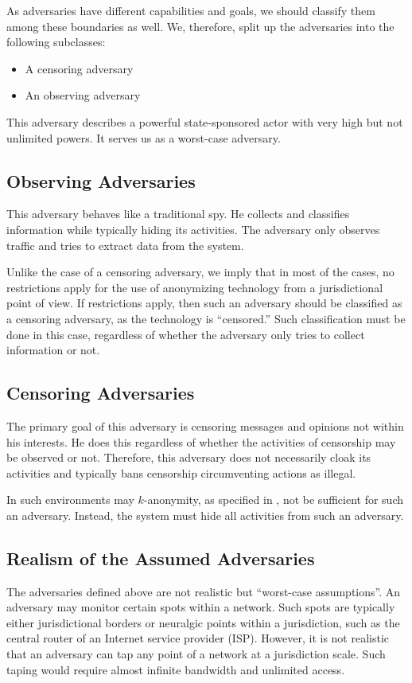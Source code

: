 As adversaries have different capabilities and goals, we should classify them among these boundaries as well. We, therefore, split up the adversaries into the following subclasses:
\begin{itemize}
	\item A censoring adversary
	\item An observing adversary
\end{itemize}

This adversary describes a powerful state-sponsored actor with very high but not unlimited powers. It serves us as a worst-case adversary.

\subsection{Observing Adversaries}
This adversary behaves like a traditional spy. He collects and classifies information while typically hiding its activities. The adversary only observes traffic and tries to extract data from the system.

Unlike the case of a censoring adversary, we imply that in most of the cases, no restrictions apply for the use of anonymizing technology from a jurisdictional point of view. If restrictions apply, then such an adversary should be classified as a censoring adversary, as the technology is ``censored.'' Such classification must be done in this case, regardless of whether the adversary only tries to collect information or not.

\subsection{Censoring Adversaries}
The primary goal of this adversary is censoring messages and opinions not within his interests. He does this regardless of whether the activities of censorship may be observed or not. Therefore, this adversary does not necessarily cloak its activities and typically bans censorship circumventing actions as illegal.

In such environments may $k$-anonymity, as specified in \cite{k-anonymous:ccs2003}, not be sufficient for such an adversary. Instead, the \MessageVortex{} system must hide all activities from such an adversary.

\subsection{Realism of the Assumed Adversaries}
The adversaries defined above are not realistic but ``worst-case assumptions''. An adversary may monitor certain spots within a network. Such spots are typically either jurisdictional borders or neuralgic points within a jurisdiction, such as the central router of an Internet service provider (ISP). However, it is not realistic that an adversary can tap any point of a network at a jurisdiction scale. Such taping would require almost infinite bandwidth and unlimited access. 

